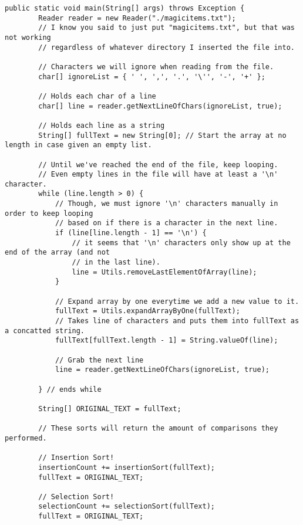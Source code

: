 \documentclass[letterpaper, 10pt,DIV=13]{scrartcl}
\numberwithin{equation}{section} %
\numberwithin{figure}{section} %
\numberwithin{table}{section} %
\begin{document}
\lstset{numbers=left, numberstyle=\tiny, stepnumber=1, numbersep=5pt, basicstyle=\footnotesize\ttfamily}
\begin{lstlisting}[frame=single, ]  
public static void main(String[] args) throws Exception {
        Reader reader = new Reader("./magicitems.txt");
        // I know you said to just put "magicitems.txt", but that was not working
        // regardless of whatever directory I inserted the file into.

        // Characters we will ignore when reading from the file.
        char[] ignoreList = { ' ', ',', '.', '\'', '-', '+' };

        // Holds each char of a line
        char[] line = reader.getNextLineOfChars(ignoreList, true);

        // Holds each line as a string
        String[] fullText = new String[0]; // Start the array at no length in case given an empty list.

        // Until we've reached the end of the file, keep looping.
        // Even empty lines in the file will have at least a '\n' character.
        while (line.length > 0) {
            // Though, we must ignore '\n' characters manually in order to keep looping
            // based on if there is a character in the next line.
            if (line[line.length - 1] == '\n') {
                // it seems that '\n' characters only show up at the end of the array (and not
                // in the last line).
                line = Utils.removeLastElementOfArray(line);
            }

            // Expand array by one everytime we add a new value to it.
            fullText = Utils.expandArrayByOne(fullText);
            // Takes line of characters and puts them into fullText as a concatted string.
            fullText[fullText.length - 1] = String.valueOf(line);

            // Grab the next line
            line = reader.getNextLineOfChars(ignoreList, true);

        } // ends while

        String[] ORIGINAL_TEXT = fullText;

        // These sorts will return the amount of comparisons they performed.

        // Insertion Sort!
        insertionCount += insertionSort(fullText);
        fullText = ORIGINAL_TEXT;

        // Selection Sort!
        selectionCount += selectionSort(fullText);
        fullText = ORIGINAL_TEXT;


\end{lstlisting}
\end{document}
